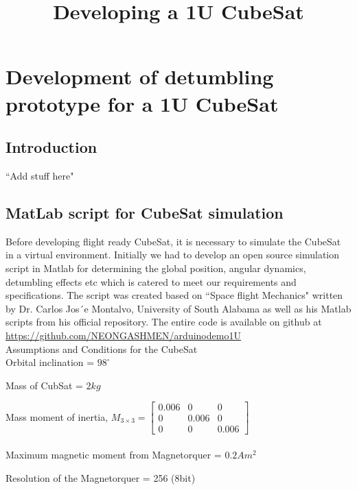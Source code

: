 \documentclass[11pt]{report}
\begin{document}
	
	\title{\textbf{\Huge Developing a 1U CubeSat}}
	\author{}
	\date{}
	\maketitle
	
	
	\chapter{Development of detumbling prototype for a 1U CubeSat}
	
	\section{Introduction}
	
	``Add stuff here"
	
	\section{MatLab script for CubeSat simulation}
	Before developing flight ready CubeSat, it is necessary to simulate the CubeSat in a virtual environment. Initially we had to develop an open source simulation script in Matlab for determining the global position, angular dynamics, detumbling effects etc which is catered to meet our requirements and specifications. The script was created based on ``Space flight Mechanics" written by Dr. Carlos Jos´e Montalvo, University of South Alabama as well as his Matlab scripts from his official repository. The entire code is available on github at \url{https://github.com/NEONGASHMEN/arduinodemo1U}\\
	
	\noindent Assumptions and Conditions for the CubeSat\\
	
	\noindent Orbital inclination = $98^{\circ}$
	
	\noindent Mass of CubSat = $2kg$
	
	\noindent Mass moment of inertia, $M_{3\times3} = $\(\begin{bmatrix}0.006 & 0 & 0\\0 & 0.006 & 0\\0 & 0 & 0.006\end{bmatrix}\) \\\\
	
	\noindent Maximum magnetic moment from Magnetorquer = $0.2Am^2$
	
	\noindent Resolution of the Magnetorquer = 256 (8bit)\\
	
\end{document}

